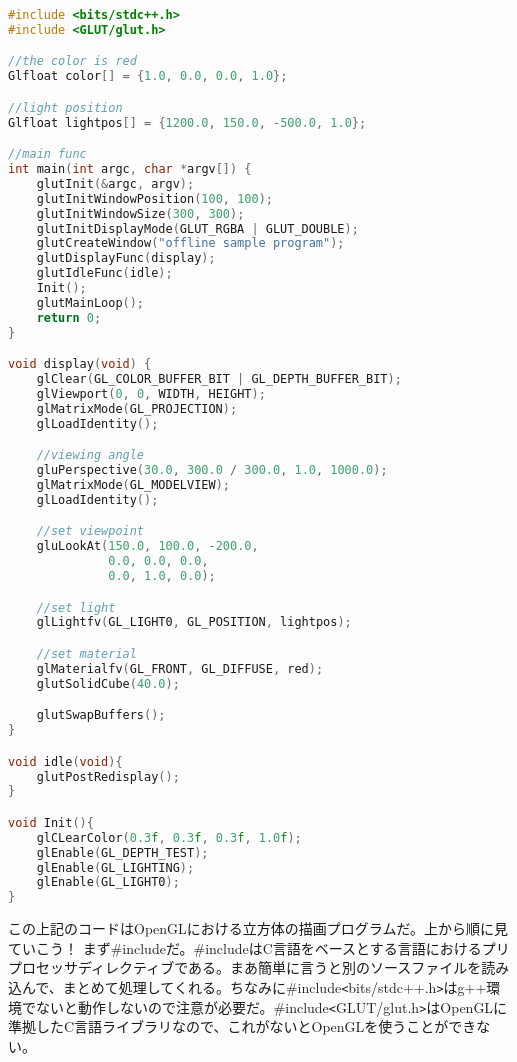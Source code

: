 \documentclass[12pt,a4paper]{jsarticle}
\begin{document}
\begin{lstlisting}[language=C++]
#include <bits/stdc++.h>
#include <GLUT/glut.h>

//the color is red
Glfloat color[] = {1.0, 0.0, 0.0, 1.0};

//light position
Glfloat lightpos[] = {1200.0, 150.0, -500.0, 1.0};

//main func
int main(int argc, char *argv[]) {
    glutInit(&argc, argv);
    glutInitWindowPosition(100, 100);
    glutInitWindowSize(300, 300);
    glutInitDisplayMode(GLUT_RGBA | GLUT_DOUBLE);
    glutCreateWindow("offline sample program");
    glutDisplayFunc(display);
    glutIdleFunc(idle);
    Init();
    glutMainLoop();
    return 0;
}

void display(void) {
    glClear(GL_COLOR_BUFFER_BIT | GL_DEPTH_BUFFER_BIT);
    glViewport(0, 0, WIDTH, HEIGHT); 
    glMatrixMode(GL_PROJECTION);
    glLoadIdentity();

    //viewing angle
    gluPerspective(30.0, 300.0 / 300.0, 1.0, 1000.0);
    glMatrixMode(GL_MODELVIEW);
    glLoadIdentity();

    //set viewpoint
    gluLookAt(150.0, 100.0, -200.0,
              0.0, 0.0, 0.0,
              0.0, 1.0, 0.0);

    //set light
    glLightfv(GL_LIGHT0, GL_POSITION, lightpos);

    //set material
    glMaterialfv(GL_FRONT, GL_DIFFUSE, red);
    glutSolidCube(40.0);

    glutSwapBuffers();
}

void idle(void){
    glutPostRedisplay();
}

void Init(){
    glCLearColor(0.3f, 0.3f, 0.3f, 1.0f);
    glEnable(GL_DEPTH_TEST);
    glEnable(GL_LIGHTING);
    glEnable(GL_LIGHT0);
}
\end{lstlisting}

この上記のコードはOpenGLにおける立方体の描画プログラムだ。上から順に見ていこう！
まず\#includeだ。\#includeはC言語をベースとする言語におけるプリプロセッサディレクティブである。まあ簡単に言うと別のソースファイルを読み込んで、まとめて処理してくれる。ちなみに\#include\verb|<|bits/stdc++.h\verb|>|はg++環境でないと動作しないので注意が必要だ。\#include\verb|<|GLUT/glut.h\verb|>|はOpenGLに準拠したC言語ライブラリなので、これがないとOpenGLを使うことができない。
\end{document}
